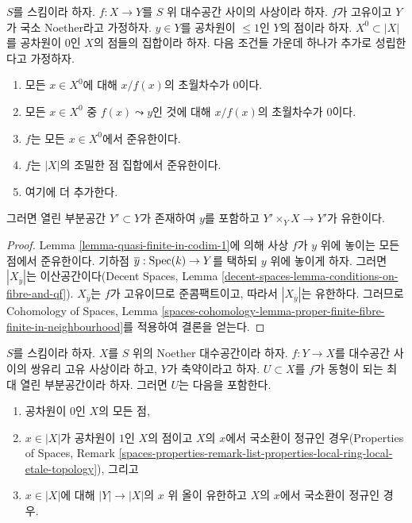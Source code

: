 \begin{lemma}
\label{lemma-finite-in-codim-1}
$S$를 스킴이라 하자. $f : X \to Y$를 $S$ 위 대수공간 사이의 사상이라
하자. $f$가 고유이고 $Y$가 국소 Noether라고 가정하자. $y \in Y$를
공차원이 $\leq 1$인 $Y$의 점이라 하자. $X^0 \subset |X|$를 공차원이
$0$인 $X$의 점들의 집합이라 하자. 다음 조건들 가운데 하나가
추가로 성립한다고 가정하자.
\begin{enumerate}
\item 모든 $x \in X^0$에 대해 $x/f(x)$의 초월차수가 $0$이다.
\item 모든 $x \in X^0$ 중 $f(x) \leadsto y$인 것에 대해 $x/f(x)$의
초월차수가 $0$이다.
\item $f$는 모든 $x \in X^0$에서 준유한이다.
\item $f$는 $|X|$의 조밀한 점 집합에서 준유한이다.
\item 여기에 더 추가한다.
\end{enumerate}
그러면 열린 부분공간 $Y' \subset Y$가 존재하여 $y$를 포함하고
$Y' \times_Y X \to Y'$가 유한이다.
\end{lemma}

\begin{proof}
Lemma \ref{lemma-quasi-finite-in-codim-1}에 의해 사상 $f$가 $y$ 위에
놓이는 모든 점에서 준유한이다. 기하점
$\overline{y} : \mathop{\mathrm{Spec}}(k) \to Y$를 택하되 $y$ 위에 놓이게 하자. 그러면
$|X_{\overline{y}}|$는 이산공간이다(Decent Spaces, Lemma
\ref{decent-spaces-lemma-conditions-on-fibre-and-qf}). $X_{\overline{y}}$는
$f$가 고유이므로 준콤팩트이고, 따라서 $|X_{\overline{y}}|$는
유한하다. 그러므로 Cohomology of Spaces, Lemma
\ref{spaces-cohomology-lemma-proper-finite-fibre-finite-in-neighbourhood}를
적용하여 결론을 얻는다.
\end{proof}

\begin{lemma}
\label{lemma-modification-normal-iso-over-codimension-1}
$S$를 스킴이라 하자. $X$를 $S$ 위의 Noether 대수공간이라 하자.
$f : Y \to X$를 대수공간 사이의 쌍유리 고유 사상이라 하고, $Y$가
축약이라고 하자. $U \subset X$를 $f$가 동형이 되는 최대 열린
부분공간이라 하자. 그러면 $U$는 다음을 포함한다.
\begin{enumerate}
\item 공차원이 $0$인 $X$의 모든 점,
\item $x \in |X|$가 공차원이 $1$인 $X$의 점이고 $X$의 $x$에서
국소환이 정규인 경우(Properties of Spaces, Remark
\ref{spaces-properties-remark-list-properties-local-ring-local-etale-topology}),
그리고
\item $x \in |X|$에 대해 $|Y| \to |X|$의 $x$ 위 올이 유한하고
$X$의 $x$에서 국소환이 정규인 경우.
\end{enumerate}
\end{lemma}


